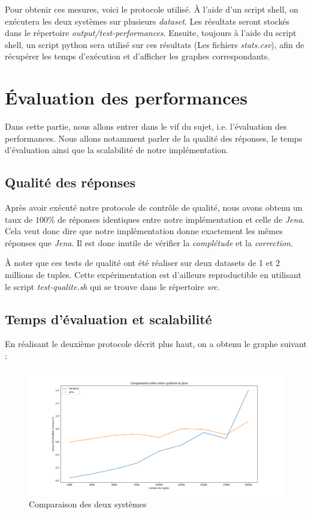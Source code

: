 \documentclass[12pt,titlepage]{article}
\begin{document}
Pour obtenir ces mesures, voici le protocole utilisé. À l'aide d'un script shell, on exécutera les deux systèmes sur plusieurs \textit{dataset}. Les résultats seront stockés dans le répertoire \textit{output/test-performances}. Ensuite, toujours à l'aide du script shell, un script python sera utilisé sur ces résultats (Les fichiers \textit{stats.csv}), afin de récupérer les temps d'exécution et d'afficher les graphes correspondants.

\section{Évaluation des performances}

Dans cette partie, nous allons entrer dans le vif du sujet, i.e. l'évaluation des performances. Nous allons notamment parler de la qualité des réponses, le temps d'évaluation ainsi que la scalabilité de notre implémentation.

\subsection{Qualité des réponses}

Après avoir exécuté notre protocole de contrôle de qualité, nous avons obtenu un taux de $100\%$ de réponses identiques entre notre implémentation et celle de \textit{Jena}. Cela veut donc dire que notre implémentation donne exactement les mêmes réponses que \textit{Jena}. Il est donc inutile de vérifier la \textit{complétude} et la \textit{correction}.

À noter que ces tests de qualité ont été réaliser sur deux datasets de 1 et 2 millions de tuples. Cette expérimentation est d'ailleurs reproductible en utilisant le script \textit{test-qualite.sh} qui se trouve dans le répertoire \textit{src}.

\subsection{Temps d'évaluation et scalabilité}

En réalisant le deuxième protocole décrit plus haut, on a obtenu le graphe suivant : 

\begin{figure}[!h]
  \centering
  \includegraphics[width=1.\textwidth]{img/temps_execution.png}
  \caption{Comparaison des deux systèmes}
\end{figure}
\end{document}
